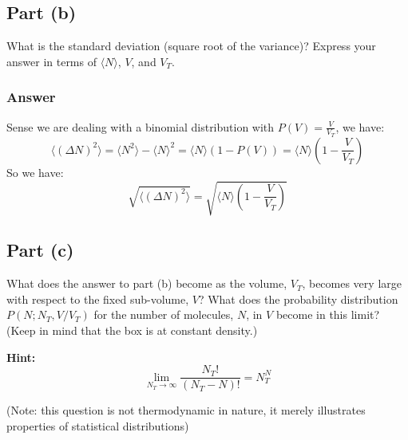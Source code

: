 \documentclass{article}
\begin{document}
\subsection{Part (b)}
What is the standard deviation (square root of the variance)? Express your answer in terms of \( \langle N \rangle \), \( V \), and \( V_T \).
\subsubsection{Answer}
Sense we are dealing with a binomial distribution with $P(V) = \frac{V}{V_T}$, we have:
\begin{equation}
    \langle (\Delta N)^2 \rangle = \langle N^2 \rangle - \langle N \rangle^2 = \langle N \rangle (1 - P(V)) = \langle N \rangle \left(1 - \frac{V}{V_T}\right)
\end{equation}
So we have:
\begin{equation}
    \boxed{\sqrt{\langle (\Delta N)^2 \rangle} = \sqrt{\langle N \rangle \left(1 - \frac{V}{V_T}\right)}}
\end{equation}

\subsection{Part (c)}
What does the answer to part (b) become as the volume, \( V_T \), becomes very large with respect to the fixed sub-volume, \( V \)? What does the probability distribution \( P(N; N_T, V/V_T) \) for the number of molecules, \( N \), in \( V \) become in this limit? (Keep in mind that the box is at constant density.)

\textbf{Hint:}
\[
\lim_{N_T \to \infty} \frac{N_T!}{(N_T - N)!} = N_T^N
\]

(Note: this question is not thermodynamic in nature, it merely illustrates properties of statistical distributions)
\end{document}
